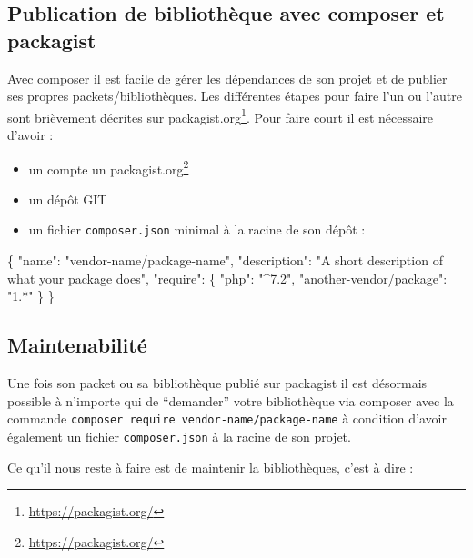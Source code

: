 \documentclass[11pt,a4paper,krantz2,11pt,oneside]{krantz}
\newenvironment{Shaded}{\begin{snugshade}}{\end{snugshade}}
\newcommand{\DataTypeTok}[1]{\textcolor[rgb]{0.27,0.27,0.27}{#1}}
\newcommand{\FunctionTok}[1]{\textcolor[rgb]{0,0,0}{#1}}
\newcommand{\StringTok}[1]{\textcolor[rgb]{0.5,0.5,0.5}{#1}}
\providecommand{\tightlist}{%
  \setlength{\itemsep}{0pt}\setlength{\parskip}{0pt}}
\renewcommand{\href}[2]{#2\footnote{\url{#1}}}
\begin{document}
\hypertarget{publication-de-bibliothuxe8que-avec-composer-et-packagist}{%
\subsection{Publication de bibliothèque avec composer et packagist}\label{publication-de-bibliothuxe8que-avec-composer-et-packagist}}

Avec composer il est facile de gérer les dépendances de son projet et de publier ses propres packets/bibliothèques. Les différentes étapes pour faire l'un ou l'autre sont brièvement décrites sur \href{https://packagist.org/}{packagist.org}. Pour faire court il est nécessaire d'avoir :

\begin{itemize}
\tightlist
\item
  un compte un \href{https://packagist.org/}{packagist.org}
\item
  un dépôt GIT
\item
  un fichier \texttt{composer.json} minimal à la racine de son dépôt :
\end{itemize}

\begin{Shaded}
\begin{Highlighting}[]
\FunctionTok{\{}
    \DataTypeTok{"name"}\FunctionTok{:} \StringTok{"vendor-name/package-name"}\FunctionTok{,}
    \DataTypeTok{"description"}\FunctionTok{:} \StringTok{"A short description of what your package does"}\FunctionTok{,}
    \DataTypeTok{"require"}\FunctionTok{:} \FunctionTok{\{}
        \DataTypeTok{"php"}\FunctionTok{:} \StringTok{"^7.2"}\FunctionTok{,}
        \DataTypeTok{"another-vendor/package"}\FunctionTok{:} \StringTok{"1.*"}
    \FunctionTok{\}}
\FunctionTok{\}}
\end{Highlighting}
\end{Shaded}

\hypertarget{maintenabilituxe9}{%
\subsection{Maintenabilité}\label{maintenabilituxe9}}

Une fois son packet ou sa bibliothèque publié sur packagist il est désormais possible à n'importe qui de ``demander'' votre bibliothèque via composer avec la commande \texttt{composer\ require\ vendor-name/package-name} à condition d'avoir également un fichier \texttt{composer.json} à la racine de son projet.

Ce qu'il nous reste à faire est de maintenir la bibliothèques, c'est à dire :
\end{document}
